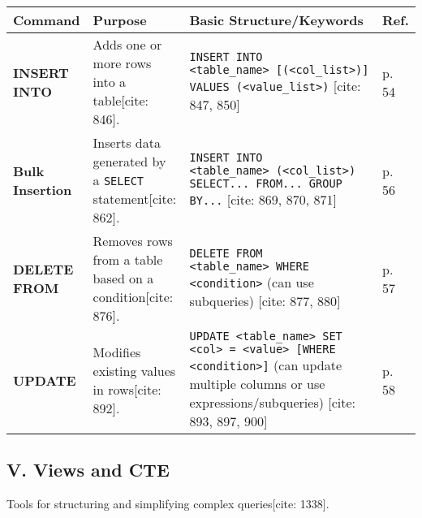 \documentclass[12pt,a4paper]{article}
\begin{document}
\begin{longtable}{>{\bfseries}p{} p{} p{} p{}}
\toprule
\textbf{Command} & \textbf{Purpose} & \textbf{Basic Structure/Keywords} & \textbf{Ref.} \\
\midrule
\endhead
\textbf{INSERT INTO} & Adds one or more rows into a table[cite: 846]. & \texttt{INSERT INTO \textless table\_name\textgreater\ [(<col\_list>)] VALUES (\textless value\_list\textgreater)} [cite: 847, 850] & p. 54 \\
\textbf{Bulk Insertion} & Inserts data generated by a \texttt{SELECT} statement[cite: 862]. & \texttt{INSERT INTO \textless table\_name\textgreater\ (\textless col\_list\textgreater) SELECT... FROM... GROUP BY...} [cite: 869, 870, 871] & p. 56 \\
\textbf{DELETE FROM} & Removes rows from a table based on a condition[cite: 876]. & \texttt{DELETE FROM \textless table\_name\textgreater\ WHERE \textless condition\textgreater} (can use subqueries) [cite: 877, 880] & p. 57 \\
\textbf{UPDATE} & Modifies existing values in rows[cite: 892]. & \texttt{UPDATE \textless table\_name\textgreater\ SET \textless col\textgreater\ = \textless value\textgreater\ [WHERE \textless condition\textgreater]} (can update multiple columns or use expressions/subqueries) [cite: 893, 897, 900] & p. 58 \\
\bottomrule
\end{longtable}

\vspace{0.5cm}

\subsection*{V. Views and CTE}
Tools for structuring and simplifying complex queries[cite: 1338].
\end{document}
